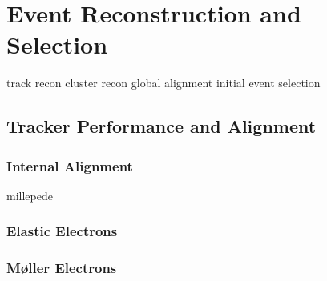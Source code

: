 \chapter{Event Reconstruction and Selection}
track recon
cluster recon
global alignment
initial event selection

\section{Tracker Performance and Alignment}
\subsection{Internal Alignment}
millepede
\subsection{Elastic Electrons}
\subsection{M{\o}ller Electrons}
\label{sec:mollers}
